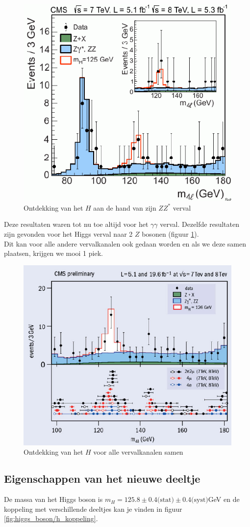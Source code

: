 \documentclass[../main.tex]{subfiles}
\begin{document}
\begin{figure}[h]
    \centering
    \includegraphics[width=0.5\linewidth]{higgs_boson/sigma_h_z_verval.png}
    \caption{Ontdekking van het $H$ aan de hand van zijn $ZZ^*$ verval}%
    \label{fig:higgs_boson/sigma_h_z_verval}
\end{figure}

Deze resultaten waren tot nu toe altijd voor het $\gamma\gamma$ verval. Dezelfde resultaten zijn gevonden voor het Higgs verval naar 2 $Z$ bosonen (figuur \ref{fig:higgs_boson/sigma_h_z_verval}).\\
Dit kan voor alle andere vervalkanalen ook gedaan worden en als we deze samen plaatsen, krijgen we mooi 1 piek.

\begin{figure}[h]
    \centering
    \includegraphics[width=0.5\linewidth]{higgs_boson/sigma_h_alles.png}
    \caption{Ontdekking van het $H$ voor alle vervalkanalen samen}%
    \label{fig:higgs_boson/sigma_h_alles}
\end{figure}

\subsection{Eigenschappen van het nieuwe deeltje}%
\label{sub:eigenschappen_van_het_nieuwe_deeltje}

De massa van het Higgs boson is $m_H=125.8\pm0.4\text{(stat)}\pm 0.4\text{(syst)}$GeV en de koppeling met verschillende deeltjes kan je vinden in figuur \ref{fig:higgs_boson/h_koppeling}.
\end{document}
